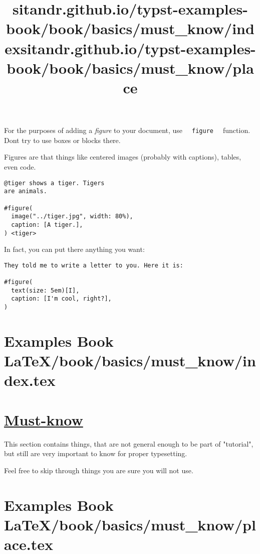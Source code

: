 For the purposes of adding a \emph{figure} to your document, use
\texttt{\ }{\texttt{\ figure\ }}\texttt{\ } function.
Don\textquotesingle t try to use boxes or blocks there.

Figures are that things like centered images (probably with captions),
tables, even code.

\begin{verbatim}
@tiger shows a tiger. Tigers
are animals.

#figure(
  image("../tiger.jpg", width: 80%),
  caption: [A tiger.],
) <tiger>
\end{verbatim}

\pandocbounded{}

In fact, you can put there anything you want:

\begin{verbatim}
They told me to write a letter to you. Here it is:

#figure(
  text(size: 5em)[I],
  caption: [I'm cool, right?],
) 
\end{verbatim}

\pandocbounded{}


\section{Examples Book LaTeX/book/basics/must_know/index.tex}
\title{sitandr.github.io/typst-examples-book/book/basics/must_know/index}

\section{\texorpdfstring{\hyperref[must-know]{Must-know}}{Must-know}}\label{must-know}

This section contains things, that are not general enough to be part of
"tutorial", but still are very important to know for proper typesetting.

Feel free to skip through things you are sure you will not use.


\section{Examples Book LaTeX/book/basics/must_know/place.tex}
\title{sitandr.github.io/typst-examples-book/book/basics/must_know/place}


